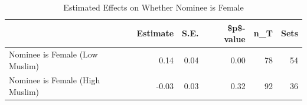 \begin{table}[ht]
\centering
\caption{Estimated Effects on Whether Nominee is Female} 
\label{tab:results.female.nominee.muslim}
\begin{tabular}{lrrrrr}
  \hline
 & Estimate & S.E. & \$p\$-value & n\_T & Sets \\ 
  \hline
Nominee is Female (Low Muslim) & 0.14 & 0.04 & 0.00 & 78 & 54 \\ 
  Nominee is Female (High Muslim) & -0.03 & 0.03 & 0.32 & 92 & 36 \\ 
   \hline
\end{tabular}
\end{table}
